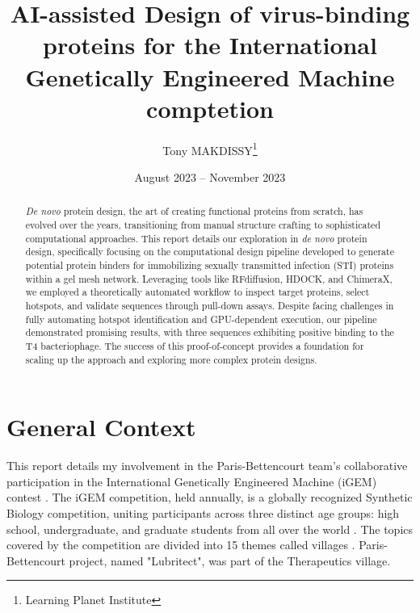 \documentclass[11pt,a4paper]{article}
\begin{document}
\title{AI-assisted Design of virus-binding proteins for the International Genetically Engineered Machine comptetion}
\author{Tony MAKDISSY\thanks{Learning Planet Institute}}



\date{August 2023 -- November 2023}
\maketitle

\begin{abstract}

    \emph{De novo} protein design, the art of creating functional proteins from scratch, has evolved over the years, transitioning from manual structure crafting to sophisticated computational approaches. This report details our exploration in \emph{de novo} protein design, specifically focusing on the computational design pipeline developed to generate potential protein binders for immobilizing sexually transmitted infection (STI) proteins within a gel mesh network. Leveraging tools like RFdiffusion, HDOCK, and ChimeraX, we employed a theoretically automated workflow to inspect target proteins, select hotspots, and validate sequences through pull-down assays. Despite facing challenges in fully automating hotspot identification and GPU-dependent execution, our pipeline demonstrated promising results, with three sequences exhibiting positive binding to the T4 bacteriophage. The success of this proof-of-concept provides a foundation for scaling up the approach and exploring more complex protein designs.
    
    \end{abstract}
    
\section{General Context}

This report details my involvement in the Paris-Bettencourt team's 
collaborative participation in the International Genetically Engineered 
Machine (iGEM) contest \cite{igem_main}. The iGEM competition, held annually, 
is a globally recognized Synthetic Biology competition, uniting 
participants across three distinct age groups: high school, 
undergraduate, and graduate students from all over the world
\cite{igem_description}.
The topics covered by the competition are divided into 15 themes called villages \cite{igem_villages}.
Paris-Bettencourt project, named "Lubritect", was part of the Therapeutics village.
\end{document}

